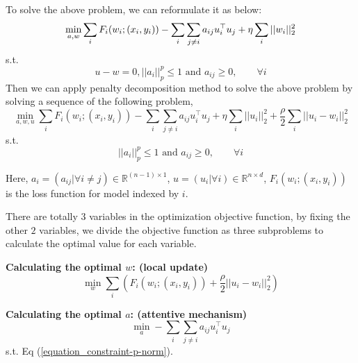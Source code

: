 {To solve the above problem, we can reformulate it as below:
\begin{equation}
    \min_{a, w} \sum_{i} F_i(w_i; (x_i, y_i)) - \sum_{i}\sum_{j \neq i} a_{ij}u_{i}^{\top}u_{j} + \eta \sum_{i}||w_{i}||_{2}^{2} \\
\end{equation}
s.t.
\begin{equation}
\label{equation_constraint-p-norm}
    u - w = 0, 
    ||a_{i}||_{p}^{p} \leq 1 \text{ and } a_{ij} \geq 0,  \quad \quad \forall i
\end{equation}
\textbf{}
Then we can apply penalty decomposition method to solve the above problem by solving a sequence of the following problem, 
\begin{equation}
    \min_{a, w, u} \sum_{i} F_i(w_i; (x_i, y_i)) - \sum_{i}\sum_{j \neq i} a_{ij}u_{i}^{\top}u_{j} + \eta \sum_{i}||u_{i}||_{2}^{2} + \frac{\rho}{2} \sum_{i} ||u_{i} - w_{i}||_{2}^{2}
\end{equation}
s.t.
\begin{equation}
\label{equation_constraint-p-norm}
    ||a_{i}||_{p}^{p} \leq 1 \text{ and } a_{ij} \geq 0,  \quad \quad \forall i
\end{equation}

Here, $a_{i} = (a_{ij}|\forall i \neq j) \in \mathbb{R}^{(n-1) \times 1}$, $u = (u_{i}| \forall i) \in \mathbb{R}^{n \times d}$, $F_i(w_i; (x_i, y_i))$ is the loss function for model indexed by $i$.


There are totally $3$ variables in the optimization objective function, by fixing the other $2$ variables, we divide the objective function as three subproblems to calculate the optimal value for each variable.

\textbf{Calculating the optimal $w$: (local update)}
\begin{equation}
    \min_{w} \sum_{i} (F_i(w_i; (x_i, y_i)) + \frac{\rho}{2}||u_i - w_i||_{2}^{2})
\end{equation}

\textbf{Calculating the optimal $a$: (attentive mechanism)}
\begin{equation}
    \min_{a} - \sum_{i} \sum_{j \neq i} a_{ij}u_{i}^{\top}u_{j}
\end{equation}
s.t. Eq (\ref{equation_constraint-p-norm}).

}
